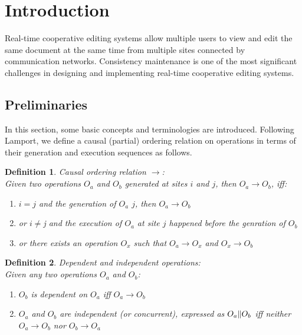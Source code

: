 \documentclass[11pt,a4paper]{article}
\begin{document}
\setlength{\parindent}{0pt}

\newtheorem{defn}{Definition}




\newpage

\tableofcontents
\newpage
\listoftables
\listoffigures
\newpage



\newpage


\section{Introduction}
Real-time cooperative editing systems allow multiple users to view and edit the same document at the same time from multiple sites connected by communication networks. Consistency maintenance is one of the most significant challenges in designing and implementing real-time cooperative editing systems. 

\subsection{Preliminaries}
In this section, some basic concepts and terminologies are introduced. Following Lamport\cite{lamport}, we define a causal (partial) ordering relation on operations in terms of their generation and execution sequences as follows.

\begin{defn}
Causal ordering relation $\rightarrow$: \\
Given two operations $O_{a}$ and $O_{b}$ generated at sites $i$ and $j$, then $O_{a}\rightarrow O_{b}$, iff:
\begin{enumerate}
 \item $i=j$ and the generation of $O_{a}$ $j$, then $O_{a}\rightarrow O_{b}$
 \item or $i \neq $j and the execution of $O_{a}$ at site $j$ happened before the 
       genration of $O_{b}$
 \item or there exists an operation $O_{x}$ such that $O_{a}\rightarrow O_{x}$
       and $O_{x}\rightarrow O_{b}$
\end{enumerate}
\end{defn}

\begin{defn}
Dependent and independent operations: \\
Given any two operations $O_{a}$ and $O_{b}$:
\begin{enumerate}
 \item $O_{b}$ is \emph{dependent} on $O_{a}$ iff $O_{a} \rightarrow O_{b}$
 \item $O_{a}$ and $O_{b}$ are \emph{independent} (or \emph{concurrent}), expressed
       as $O_{a} \Arrowvert O_{b}$ iff neither $O_{a}\rightarrow O_{b}$ nor
       $O_{b}\rightarrow O_{a}$
\end{enumerate}
\end{defn}
\end{document}

